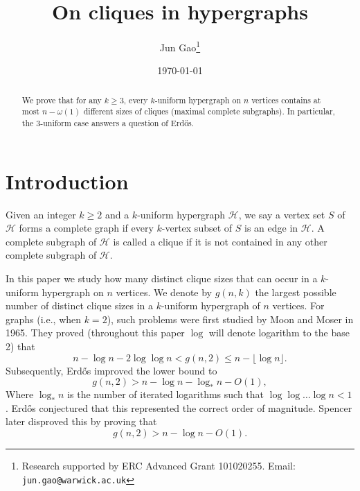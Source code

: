 \documentclass[11pt,a4paper]{article}
\begin{document}
%
\title{\bf\Large On cliques in hypergraphs}
%
\date{\today}
%
\author{Jun Gao\thanks{Research supported by ERC Advanced Grant 101020255. Email: \texttt{jun.gao@warwick.ac.uk}}}
%
\maketitle
\begin{abstract}
We prove that for any $k \ge 3$, every $k$-uniform hypergraph on $n$ vertices contains at most $n - \omega(1)$ different sizes of cliques (maximal complete subgraphs). In particular, the 3-uniform case answers a question of Erd\H{o}s.
\end{abstract}

\section{Introduction}
Given an integer $k\ge 2$ and a $k$-uniform hypergraph $\mathcal{H}$, we say a vertex set $S$ of $\mathcal{H}$ forms a complete graph if every $k$-vertex subset of $S$ is an edge in $\mathcal{H}$. A complete subgraph of $\mathcal{H}$ is called a clique if it is not contained in any other complete subgraph of $\mathcal{H}$.

In this paper we study how many distinct clique sizes that can occur in a $k$-uniform hypergraph on $n$ vertices. We denote by 
$g(n,k)$ the largest possible number of distinct clique sizes in a $k$-uniform hypergraph of $n$ vertices.
For graphs (i.e., when $k=2$), such problems were first studied by Moon and Moser \cite{MoonMoser65} in 1965. They proved (throughout this paper $\log$ will denote logarithm to the base 2) that
\[
 n-\log n-2\log\log n < g(n,2) \le n-\lfloor\log n \rfloor.
\]
Subsequently, Erd\H{o}s \cite{Erdos66} improved the lower bound to 
\[
  g(n,2)> n-\log n-\log_* n -O(1),
\]
Where $\log_* n$ is the number of iterated logarithms such that $\log \log \dots \log n <1$.
Erd\H{o}s conjectured that this represented the correct order of magnitude.  Spencer \cite{Spencer71} later disproved this by proving that
\[
g(n,2)>n-\log n -O(1) .
\]
\end{document}
